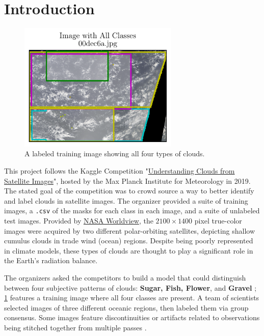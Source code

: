 \section{Introduction}
\begin{figure}
    \centering
    \includegraphics[width=3in]{figs/all_labels.pdf}
    \caption{A labeled training image showing all four types of clouds.}
    \label{fig:all_labels}
\end{figure}
%
This project follows the Kaggle Competition "\href{https://www.kaggle.com/competitions/understanding_cloud_organization/overview}{Understanding Clouds from Satellite Images}", hosted by the Max Planck Institute for Meteorology in 2019. The stated goal of the competition was to crowd source a way to better identify and label clouds in satellite images. The organizer provided a suite of training images, a \texttt{.csv} of the masks for each class in each image, and a suite of unlabeled test images. 
Provided by \href{https://worldview.earthdata.nasa.gov/}{NASA Worldview}, the \(2100 \times 1400\) pixel true-color images were acquired by two different polar-orbiting satellites, depicting shallow cumulus clouds in trade wind (ocean) regions. Despite being poorly represented in climate models, these types of clouds are thought to play a significant role in the Earth's radiation balance.

The organizers asked the competitors to build a model that could distinguish between four subjective patterns of clouds: \textbf{Sugar, Fish, Flower}, and \textbf{Gravel} \cite{rasp_CombiningCrowdsourcingDeep_2020, maxplanckinstituteformeteorology_UnderstandingCloudsSatellite_}; \cref{fig:all_labels} features a training image where all four classes are present. A team of scientists selected images of three different oceanic regions, then labeled them via group consensus. Some images feature discontinuities or artifacts related to observations being stitched together from multiple passes \cite{maxplanckinstituteformeteorology_UnderstandingCloudsSatellite_}.

